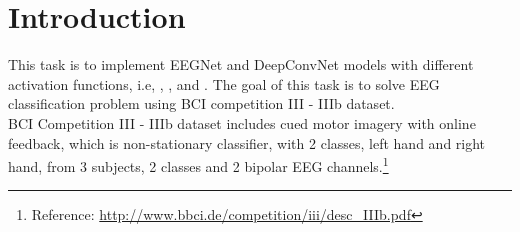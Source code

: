 \chapter{Introduction}
\indent
	This task is to implement EEGNet and DeepConvNet models with different activation functions, i.e, 
	, , and .
	The goal of this task is to solve EEG classification problem using BCI competition III - IIIb dataset.\\
	BCI Competition III - IIIb dataset includes cued motor imagery with online feedback, which is non-stationary classifier,
	with 2 classes, left hand and right hand, from 3 subjects, 2 classes and 2 bipolar EEG channels.\footnote{Reference: \url{http://www.bbci.de/competition/iii/desc_IIIb.pdf}}
